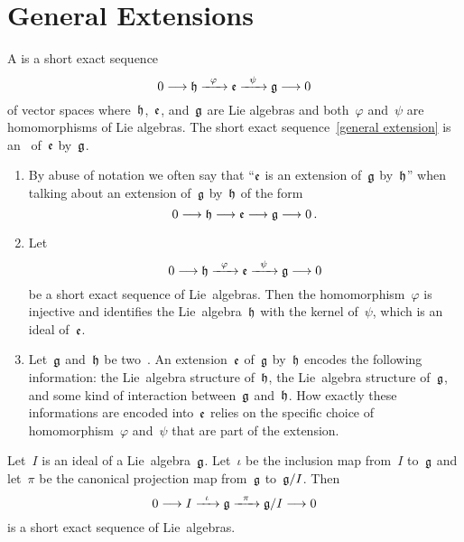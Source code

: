 \section{General Extensions}


\begin{definition}
	A  is a short exact sequence
	\begin{equation}
		\label{general extension}
		0 
		\to
		\hlie
		\xto{\varphi}
		\elie
		\xto{\psi}
		\glie
		\to
		0
	\end{equation}
	of vector spaces where~$\mathfrak{h}$,~$\mathfrak{e}$, and~$\mathfrak{g}$ are Lie algebras and both~$\varphi$ and~$\psi$ are homomorphisms of Lie algebras.
	The short exact sequence~\eqref{general extension} is an~ of~$\mathfrak{e}$ by~$\mathfrak{g}$.
\end{definition}


\begin{remark}
	\leavevmode
	\begin{enumerate}
		\item
			By abuse of notation we often say that \enquote{$\mathfrak{e}$ is an extension of~$\mathfrak{g}$ by~$\mathfrak{h}$} when talking about an extension
			of~$\mathfrak{g}$ by~$\mathfrak{h}$ of the form
			\[
				0 
				\to
				\hlie
				\to
				\elie
				\to
				\glie
				\to
				0 \,.
			\]
		\item
			Let
			\[
				0
				\to
				\hlie
				\xto{\varphi}
				\elie
				\xto{\psi}
				\glie
				\to
				0
			\]
			be a short exact sequence of Lie~algebras.
			Then the homomorphism~$\varphi$ is injective and identifies the Lie~algebra~$\mathfrak{h}$ with the kernel of~$\psi$, which is an ideal of~$\mathfrak{e}$.
		\item
			Let~$\mathfrak{g}$ and~$\mathfrak{h}$ be two~\liealgebra{$\kf$}.
			An extension~$\mathfrak{e}$ of~$\mathfrak{g}$ by~$\mathfrak{h}$ encodes the following information:
			the Lie~algebra structure of~$\mathfrak{h}$, the Lie~algebra structure of~$\mathfrak{g}$, and some kind of interaction between~$\mathfrak{g}$ and~$\mathfrak{h}$.
			How exactly these informations are encoded into~$\mathfrak{e}$ relies on the specific choice of homomorphism~$\varphi$ and~$\psi$ that are part of the extension.
	\end{enumerate}
\end{remark}


\begin{example}
	\label{generic short exact sequence}
	Let~$I$ is an ideal of a Lie~algebra~$\mathfrak{g}$.
	Let~$\iota$ be the inclusion map from~$I$ to~$\mathfrak{g}$ and let~$\pi$ be the canonical projection map from~$\mathfrak{g}$ to~$\mathfrak{g}/I$.
	Then
	\[
		0
		\to
		I
		\xto{\iota}
		\glie
		\xto{\pi}
		\glie/I
		\to
		0
	\]
	is a short exact sequence of Lie~algebras.
\end{example}


